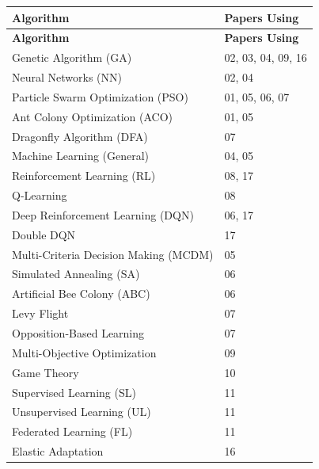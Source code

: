 \documentclass[12pt]{article}
\begin{document}
\begin{longtable}{|p{3.5cm}|p{6cm}|}
	\toprule
	\textbf{Algorithm}                    & \textbf{Papers Using} \\
	\midrule
	\endfirsthead
	\toprule
	\textbf{Algorithm}                    & \textbf{Papers Using} \\
	\midrule
	\endhead
	\midrule
	\endfoot
	\bottomrule
	\endlastfoot

	Genetic Algorithm (GA)                & 02, 03, 04, 09, 16    \\
	Neural Networks (NN)                  & 02, 04                \\
	Particle Swarm Optimization (PSO)     & 01, 05, 06, 07        \\
	Ant Colony Optimization (ACO)         & 01, 05                \\
	Dragonfly Algorithm (DFA)             & 07                    \\
	Machine Learning (General)            & 04, 05                \\
	Reinforcement Learning (RL)           & 08, 17                \\
	Q-Learning                            & 08                    \\
	Deep Reinforcement Learning (DQN)     & 06, 17                \\
	Double DQN                            & 17                    \\
	Multi-Criteria Decision Making (MCDM) & 05                    \\
	Simulated Annealing (SA)              & 06                    \\
	Artificial Bee Colony (ABC)           & 06                    \\
	Levy Flight                           & 07                    \\
	Opposition-Based Learning             & 07                    \\
	Multi-Objective Optimization          & 09                    \\
	Game Theory                           & 10                    \\
	Supervised Learning (SL)              & 11                    \\
	Unsupervised Learning (UL)            & 11                    \\
	Federated Learning (FL)               & 11                    \\
	Elastic Adaptation                    & 16                    \\
\end{longtable}
\end{document}
